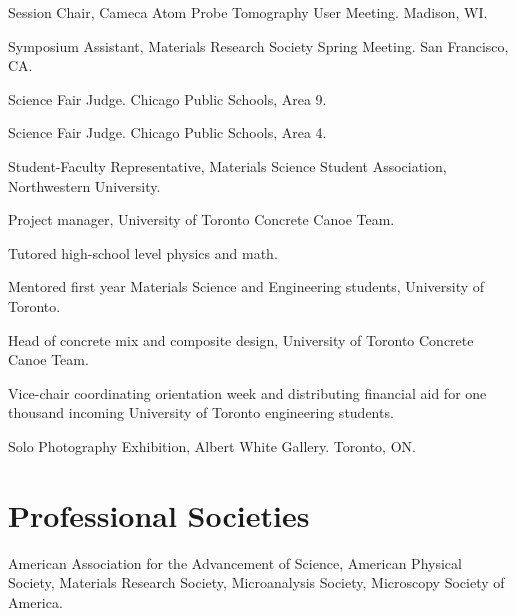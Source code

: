 Session Chair, Cameca Atom Probe Tomography User Meeting. Madison, WI.

Symposium Assistant, Materials Research Society Spring Meeting. San Francisco, CA.

\begingroup\setlength{\parskip}{0.1cm}
Science Fair Judge. Chicago Public Schools, Area 9.

Science Fair Judge. Chicago Public Schools, Area 4.

Student-Faculty Representative, Materials Science Student Association, Northwestern University.

Project manager, University of Toronto Concrete Canoe Team.

Tutored high-school level physics and math.

Mentored first year Materials Science and Engineering students, University of Toronto.

Head of concrete mix and composite design, University of Toronto Concrete Canoe Team.

Vice-chair coordinating orientation week and distributing financial aid for one thousand incoming University of Toronto engineering students.

Solo Photography Exhibition, Albert White Gallery. Toronto, ON.
\endgroup

\section*{Professional Societies}
American Association for the Advancement of Science, American Physical Society, Materials Research Society, Microanalysis Society, Microscopy Society of America.